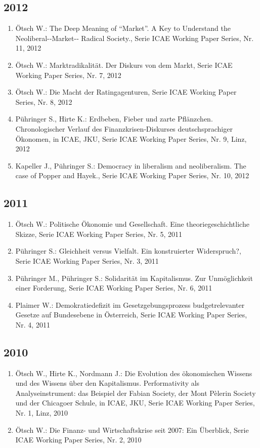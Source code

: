 \subsection*{2012}
\begin{enumerate}
    	 \item Ötsch W.: The Deep Meaning of “Market”. A Key to Understand the Neoliberal-­‐Market-­‐ Radical Society., Serie ICAE Working Paper Series, Nr. 11, 2012
	 \item Ötsch W.: Marktradikalität. Der Diskurs von \glqq dem Markt\grqq{}, Serie ICAE Working Paper Series, Nr. 7, 2012
	 \item Ötsch W.: Die Macht der Ratingagenturen, Serie ICAE Working Paper Series, Nr. 8, 2012
	 \item Pühringer S., Hirte K.: Erdbeben, Fieber und zarte Pflänzchen. Chronologischer Verlauf des Finanzkrisen‐Diskurses deutschsprachiger Ökonomen, in ICAE, JKU, Serie ICAE Working Paper Series, Nr. 9, Linz, 2012
	 \item Kapeller J., Pühringer S.: Democracy in liberalism and neoliberalism. The case of Popper and Hayek., Serie ICAE Working Paper Series, Nr. 10, 2012
\end{enumerate}
\subsection*{2011}
\begin{enumerate}
    	 \item Ötsch W.: Politische Ökonomie und Gesellschaft. Eine theoriegeschichtliche Skizze, Serie ICAE Working Paper Series, Nr. 5, 2011
	 \item Pühringer S.: Gleichheit versus Vielfalt. Ein konstruierter Widerspruch?, Serie ICAE Working Paper Series, Nr. 3, 2011
	 \item Pühringer M., Pühringer S.: Solidarität im Kapitalismus. Zur Unmöglichkeit einer Forderung, Serie ICAE Working Paper Series, Nr. 6, 2011
	 \item Plaimer W.: Demokratiedefizit im Gesetzgebungsprozess budgetrelevanter Gesetze auf Bundesebene in Österreich, Serie ICAE Working Paper Series, Nr. 4, 2011
\end{enumerate}
\subsection*{2010}
\begin{enumerate}
    	 \item Ötsch W., Hirte K., Nordmann J.: Die Evolution des ökonomischen Wissens und des Wissens über den Kapitalismus. Performativity als Analyseinstrument: das Beispiel der Fabian Society, der Mont Pèlerin Society und der Chicagoer Schule, in ICAE, JKU, Serie ICAE Working Paper Series, Nr. 1, Linz, 2010
	 \item Ötsch W.: Die Finanz-­ und Wirtschaftskrise seit 2007: Ein Überblick, Serie ICAE Working Paper Series, Nr. 2, 2010
\end{enumerate}
